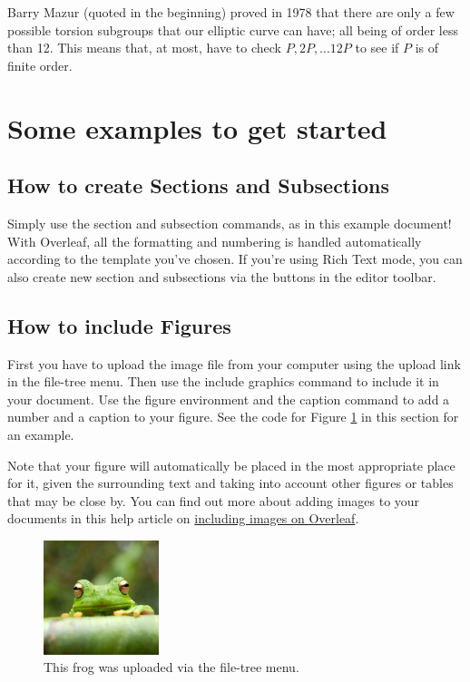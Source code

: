 \documentclass{article}
\begin{document}
Barry Mazur (quoted in the beginning) proved in 1978 that there are only a few possible torsion subgroups that our elliptic curve can have; all being of order less than 12. This means that, at most, have to check $P, 2P, ... 12P$ to see if $P$ is of finite order.

\newpage

\section{Some examples to get started}

\subsection{How to create Sections and Subsections}

Simply use the section and subsection commands, as in this example document! With Overleaf, all the formatting and numbering is handled automatically according to the template you've chosen. If you're using Rich Text mode, you can also create new section and subsections via the buttons in the editor toolbar.

\subsection{How to include Figures}

First you have to upload the image file from your computer using the upload link in the file-tree menu. Then use the include graphics command to include it in your document. Use the figure environment and the caption command to add a number and a caption to your figure. See the code for Figure \ref{fig:frog} in this section for an example.

Note that your figure will automatically be placed in the most appropriate place for it, given the surrounding text and taking into account other figures or tables that may be close by. You can find out more about adding images to your documents in this help article on \href{https://www.overleaf.com/learn/how-to/Including_images_on_Overleaf}{including images on Overleaf}.
\newpage
\begin{figure}
\centering
\includegraphics[width=0.3\textwidth]{frog.jpg}
\caption{\label{fig:frog}This frog was uploaded via the file-tree menu.}
\end{figure}
\end{document}
